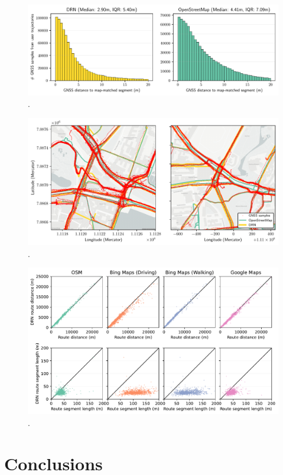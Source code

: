 \begin{figure}[htbp]
\centering 
\includegraphics[width=\linewidth]{images/routing-gnss-mapmatching-distribution.pdf}
\caption{.}
\label{fig:}
\end{figure}

\begin{figure}[htbp]
\centering 
\includegraphics[width=\linewidth]{images/routing-mapmatching-distance.pdf}
\caption{.}
\label{fig:}
\end{figure}

\begin{figure}[htbp]
\centering 
\includegraphics[width=\linewidth]{images/routing-distance-comparison.pdf}
\caption{.}
\label{fig:}
\end{figure}

\section{Conclusions}